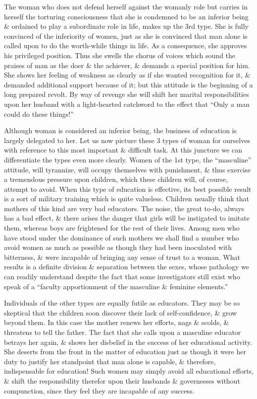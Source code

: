 \documentclass{article}
\begin{document}
The woman who does not defend herself against the womanly role but carries in herself the torturing consciousness that she is condemned to be an inferior being \& ordained to play a subordinate role in life, makes up the 3rd type. She is fully convinced of the inferiority of women, just as she is convinced that man alone is called upon to do the worth-while things in life. As a consequence, she approves his privileged position. Thus she swells the chorus of voices which sound the praises of man as the doer \& the achiever, \& demands a special position for him. She shows her feeling of weakness as clearly as if she wanted recognition for it, \& demanded additional support because of it; but this attitude is the beginning of a long prepared revolt. By way of revenge she will shift her marital responsibilities upon her husband with a light-hearted catchword to the effect that ``Only a man could do these things!''

Although woman is considered an inferior being, the business of education is largely delegated to her. Let us now picture these 3 types of woman for ourselves with reference to this most important \& difficult task. At this juncture we can differentiate the types even more clearly. Women of the 1st type, the ``masculine'' attitude, will tyrannize, will occupy themselves with punishment, \& thus exercise a tremendous pressure upon children, which these children will, of course, attempt to avoid. When this type of education is effective, its best possible result is a sort of military training which is quite valueless. Children usually think that mothers of this kind are very bad educators. The noise, the great to-do, always has a bad effect, \& there arises the danger that girls will be instigated to imitate them, whereas boys are frightened for the rest of their lives. Among men who have stood under the dominance of such mothers we shall find a number who avoid women as much as possible as though they had been inoculated with bitterness, \& were incapable of bringing any sense of trust to a woman. What results is a definite division \& separation between the sexes, whose pathology we can readily understand despite the fact that some investigators still exist who speak of a ``faculty apportionment of the masculine \& feminine elements.''

Individuals of the other types are equally futile as educators. They may be so skeptical that the children soon discover their lack of self-confidence, \& grow beyond them. In this case the mother renews her efforts, nags \& scolds, \& threatens to tell the father. The fact that she calls upon a masculine educator betrays her again, \& shows her disbelief in the success of her educational activity. She deserts from the front in the matter of education just as though it were her duty to justify her standpoint that man alone is capable, \& therefore, indispensable for education! Such women may simply avoid all educational efforts, \& shift the responsibility therefor upon their husbands \& governesses without compunction, since they feel they are incapable of any success.
\end{document}
